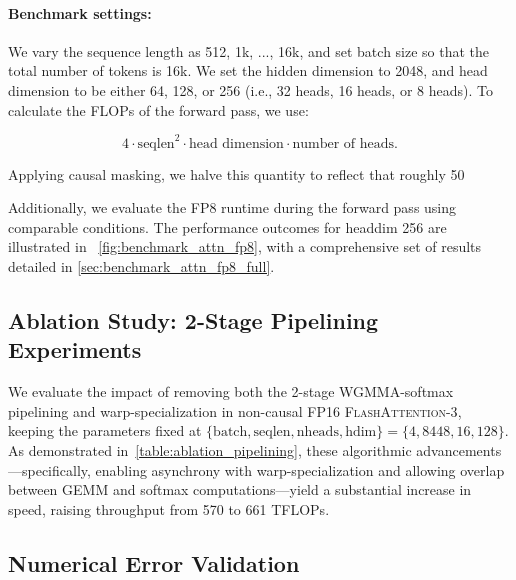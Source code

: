 \paragraph{Benchmark settings:} We vary the sequence length as 512, 1k, ..., 16k, and set batch size so that the total number of tokens is 16k. We set the hidden dimension to 2048, and head dimension to be either 64, 128, or 256 (i.e., 32 heads, 16 heads, or 8 heads). To calculate the FLOPs of the forward pass, we use:

\begin{equation*}
  4 \cdot \text{seqlen}^2 \cdot \text{head dimension} \cdot \text{number of heads}.
\end{equation*}

Applying causal masking, we halve this quantity to reflect that roughly 50%

Additionally, we evaluate the FP8 runtime during the forward pass using comparable conditions. The performance outcomes for headdim 256 are illustrated in ~\cref{fig:benchmark_attn_fp8}, with a comprehensive set of results detailed in \cref{sec:benchmark_attn_fp8_full}.

\subsection{Ablation Study: 2-Stage Pipelining Experiments}
\label{sec:2-stage-pipelining-experiments}

We evaluate the impact of removing both the 2-stage WGMMA-softmax pipelining and warp-specialization in non-causal FP16 \textsc{FlashAttention-3}, keeping the parameters fixed at $\{\text{batch}, \text{seqlen}, \text{nheads}, \text{hdim}\} = \{ 4, 8448, 16, 128\}$. As demonstrated in~\cref{table:ablation_pipelining}, these algorithmic advancements—specifically, enabling asynchrony with warp-specialization and allowing overlap between GEMM and softmax computations—yield a substantial increase in speed, raising throughput from 570 to 661 TFLOPs.

\subsection{Numerical Error Validation}
\label{sec:numerical_error}

